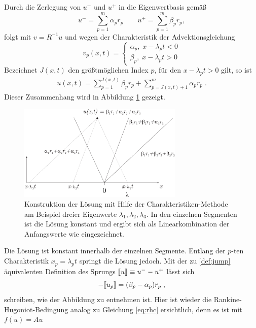 Durch die Zerlegung von $u^-$ und $u^+$ in die Eigenwertbasis gemäß
\begin{equation*}
  u^- = \sum_{p=1}^m \alpha_p r_p \qquad u^+ = \sum_{p=1}^m \beta_p r_p,
\end{equation*}
folgt mit $v = R^{-1}u$ und wegen der Charakteristik der Advektionsgleichung
\begin{equation*}
  v_p(x,t) = \begin{cases} \alpha_p , \; x - \lambda_p t < 0 \\
                           \beta_p  , \; x - \lambda_p t > 0
             \end{cases}
\end{equation*}
Bezeichnet $J(x,t)$ den größtmöglichen Index $p$, für den $x-\lambda_p t > 0$ gilt, so ist
\begin{align*}
  u(x,t) = \sum_{p=1}^{J(x,t)} \beta_p r_p + \sum_{p={J(x,t)}+1}^m \alpha_p r_p \; .
\end{align*}
Dieser Zusammenhang wird in Abbildung \ref{fig:torte} gezeigt.
\begin{figure}
  \centering
  \includegraphics[width=0.7\textwidth]{files/Torte.pdf}
  \caption{Konstruktion der Lösung mit Hilfe der Charakteristiken-Methode am Beispiel dreier Eigenwerte $\lambda_1,\lambda_2,\lambda_3$. In den einzelnen Segmenten ist die Lösung konstant und ergibt sich als Linearkombination der Anfangswerte wie eingezeichnet.}
  \label{fig:torte}
\end{figure}
Die Lösung ist konstant innerhalb der einzelnen Segmente. Entlang der $p$-ten Charakteristik $x_p=\lambda_p t$ springt die Lösung jedoch. Mit der zu \ref{def:jump} äquivalenten Definition des Sprungs ${\llbracket u \rrbracket\equiv u^- - u^+}$ lässt sich
\begin{equation}
  -\llbracket u_p \rrbracket = (\beta_p - \alpha_p) r_p \; ,
  \label{eq:TortenJump}
\end{equation}
schreiben, wie der Abbildung zu entnehmen ist. Hier ist wieder die Rankine-Hugoniot-Bedingung analog zu Gleichung \eqref{eq:rhc} ersichtlich, denn es ist mit $f(u) = A u$
